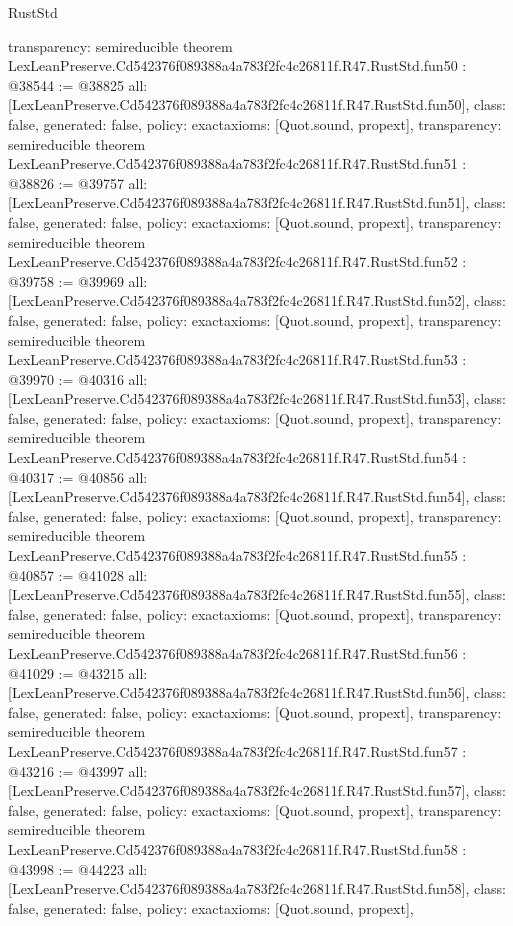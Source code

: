 \begin{lexlean}{RustStd}
\begin{coremodule}
{  transparency: semireducible
}
theorem LexLeanPreserve.Cd542376f089388a4a783f2fc4c26811f.R47.RustStd.fun50 : @38544 := @38825 {
  all: [LexLeanPreserve.Cd542376f089388a4a783f2fc4c26811f.R47.RustStd.fun50],
  class: false,
  generated: false,
  policy: exact{axioms: [Quot.sound, propext]},
  transparency: semireducible
}
theorem LexLeanPreserve.Cd542376f089388a4a783f2fc4c26811f.R47.RustStd.fun51 : @38826 := @39757 {
  all: [LexLeanPreserve.Cd542376f089388a4a783f2fc4c26811f.R47.RustStd.fun51],
  class: false,
  generated: false,
  policy: exact{axioms: [Quot.sound, propext]},
  transparency: semireducible
}
theorem LexLeanPreserve.Cd542376f089388a4a783f2fc4c26811f.R47.RustStd.fun52 : @39758 := @39969 {
  all: [LexLeanPreserve.Cd542376f089388a4a783f2fc4c26811f.R47.RustStd.fun52],
  class: false,
  generated: false,
  policy: exact{axioms: [Quot.sound, propext]},
  transparency: semireducible
}
theorem LexLeanPreserve.Cd542376f089388a4a783f2fc4c26811f.R47.RustStd.fun53 : @39970 := @40316 {
  all: [LexLeanPreserve.Cd542376f089388a4a783f2fc4c26811f.R47.RustStd.fun53],
  class: false,
  generated: false,
  policy: exact{axioms: [Quot.sound, propext]},
  transparency: semireducible
}
theorem LexLeanPreserve.Cd542376f089388a4a783f2fc4c26811f.R47.RustStd.fun54 : @40317 := @40856 {
  all: [LexLeanPreserve.Cd542376f089388a4a783f2fc4c26811f.R47.RustStd.fun54],
  class: false,
  generated: false,
  policy: exact{axioms: [Quot.sound, propext]},
  transparency: semireducible
}
theorem LexLeanPreserve.Cd542376f089388a4a783f2fc4c26811f.R47.RustStd.fun55 : @40857 := @41028 {
  all: [LexLeanPreserve.Cd542376f089388a4a783f2fc4c26811f.R47.RustStd.fun55],
  class: false,
  generated: false,
  policy: exact{axioms: [Quot.sound, propext]},
  transparency: semireducible
}
theorem LexLeanPreserve.Cd542376f089388a4a783f2fc4c26811f.R47.RustStd.fun56 : @41029 := @43215 {
  all: [LexLeanPreserve.Cd542376f089388a4a783f2fc4c26811f.R47.RustStd.fun56],
  class: false,
  generated: false,
  policy: exact{axioms: [Quot.sound, propext]},
  transparency: semireducible
}
theorem LexLeanPreserve.Cd542376f089388a4a783f2fc4c26811f.R47.RustStd.fun57 : @43216 := @43997 {
  all: [LexLeanPreserve.Cd542376f089388a4a783f2fc4c26811f.R47.RustStd.fun57],
  class: false,
  generated: false,
  policy: exact{axioms: [Quot.sound, propext]},
  transparency: semireducible
}
theorem LexLeanPreserve.Cd542376f089388a4a783f2fc4c26811f.R47.RustStd.fun58 : @43998 := @44223 {
  all: [LexLeanPreserve.Cd542376f089388a4a783f2fc4c26811f.R47.RustStd.fun58],
  class: false,
  generated: false,
  policy: exact{axioms: [Quot.sound, propext]},
}
\end{coremodule}
\end{lexlean}
